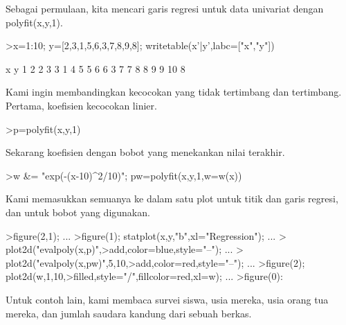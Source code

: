 \documentclass[a4paper,10pt]{article}
\begin{document}
\begin{eulernotebook}
\begin{eulercomment}
Sebagai permulaan, kita mencari garis regresi untuk data univariat
dengan polyfit(x,y,1).
\end{eulercomment}
\begin{eulerprompt}
>x=1:10; y=[2,3,1,5,6,3,7,8,9,8]; writetable(x'|y',labc=["x","y"])
\end{eulerprompt}
\begin{euleroutput}
           x         y
           1         2
           2         3
           3         1
           4         5
           5         6
           6         3
           7         7
           8         8
           9         9
          10         8
\end{euleroutput}
\begin{eulercomment}
Kami ingin membandingkan kecocokan yang tidak tertimbang dan
tertimbang. Pertama, koefisien kecocokan linier.
\end{eulercomment}
\begin{eulerprompt}
>p=polyfit(x,y,1)
\end{eulerprompt}
\begin{euleroutput}
  [0.733333,  0.812121]
\end{euleroutput}
\begin{eulercomment}
Sekarang koefisien dengan bobot yang menekankan nilai terakhir.
\end{eulercomment}
\begin{eulerprompt}
>w &= "exp(-(x-10)^2/10)"; pw=polyfit(x,y,1,w=w(x))
\end{eulerprompt}
\begin{euleroutput}
  [4.71566,  0.38319]
\end{euleroutput}
\begin{eulercomment}
Kami memasukkan semuanya ke dalam satu plot untuk titik dan garis
regresi, dan untuk bobot yang digunakan.
\end{eulercomment}
\begin{eulerprompt}
>figure(2,1);  ...
>figure(1); statplot(x,y,"b",xl="Regression"); ...
>  plot2d("evalpoly(x,p)",>add,color=blue,style="--"); ...
>  plot2d("evalpoly(x,pw)",5,10,>add,color=red,style="--"); ...
>figure(2); plot2d(w,1,10,>filled,style="/",fillcolor=red,xl=w); ...
>figure(0):
\end{eulerprompt}
\begin{eulercomment}
Untuk contoh lain, kami membaca survei siswa, usia mereka, usia orang
tua mereka, dan jumlah saudara kandung dari sebuah berkas.


\end{eulercomment}
\end{eulernotebook}
\end{document}
